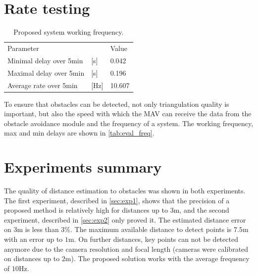 \section{Rate testing}
\begin{table}[ht]
    \begin{center}
      \begin{tabular}{lll}
      \hline
        Parameter & & Value \\
        Minimal delay over 5min & [s]  & 0.042 \\
        Maximal delay over 5min & [s]  & 0.196 \\
        Average rate over 5min  & [Hz] & 10.607 \\ 
      \end{tabular}
    \end{center}
    \caption{Proposed system working frequency.}
    \label{tab:eval_freq}
\end{table}

To ensure that obstacles can be detected, not only triangulation quality is important, but also the speed with which the MAV can receive the data from the obstacle avoidance module and the frequency of a system.
The working frequency, max and min delays are shown in \autoref{tab:eval_freq}.
 
\section{Experiments summary}
The quality of distance estimation to obstacles was shown in both experiments.
The first experiment, described in \autoref{sec:exp1}, shows that the precision of a proposed method is relatively high for distances up to 3m, and the second experiment, described in \autoref{sec:exp2} only proved it. 
The estimated distance error on $3$m is less than $3\%$.
The maximum available distance to detect points is $7.5$m with an error up to $1$m.
On further distances, key points can not be detected anymore due to the camera resolution and focal length (cameras were calibrated on distances up to $2$m).
The proposed solution works with the average frequency of $10$Hz.
